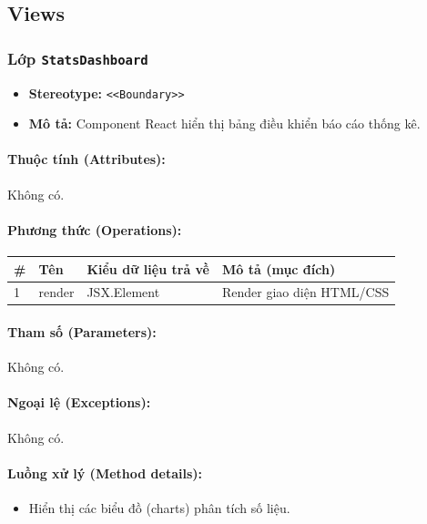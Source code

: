 \documentclass[12pt,a4paper]{article}
\begin{document}
\subsection{Views}

\subsubsection{Lớp \texttt{StatsDashboard}}
\begin{itemize}[leftmargin=*]
    \item \textbf{Stereotype:} \texttt{\textless{}\textless{}Boundary\textgreater{}\textgreater{}}
    \item \textbf{Mô tả:} Component React hiển thị bảng điều khiển báo cáo thống kê.
\end{itemize}

\paragraph{Thuộc tính (Attributes):}
Không có.

\paragraph{Phương thức (Operations):}
\begin{longtable}{|p{0.6cm}|p{3.8cm}|p{2.6cm}|p{6.5cm}|}
\hline
\textbf{\#} & \textbf{Tên} & \textbf{Kiểu dữ liệu trả về} & \textbf{Mô tả (mục đích)} \\ \hline
\endhead
1 & render & JSX.Element & Render giao diện HTML/CSS \\ \hline
\end{longtable}

\paragraph{Tham số (Parameters):}
Không có.

\paragraph{Ngoại lệ (Exceptions):}
Không có.

\paragraph{Luồng xử lý (Method details):}
\begin{itemize}[leftmargin=*]
    \item Hiển thị các biểu đồ (charts) phân tích số liệu.
\end{itemize}
\end{document}
